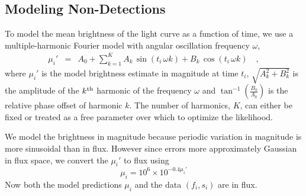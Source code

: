 \documentclass[12pt,preprint]{aastex}
\begin{document}
\subsection{Modeling Non-Detections}
To model the mean brightness of the light curve as a function of time, we use a multiple-harmonic Fourier model with angular oscillation frequency $\omega$,
\begin{eqnarray}\displaystyle
\mu_i' &=& A_0 + \sum_{k=1}^K A_k\, \sin (t_i \, \omega  k) + B_k\, \cos (t_i \, \omega  k)
\quad ,\label{eq:fourier}
\end{eqnarray}
where $\mu_i'$ is the model brightness estimate in magnitude at time $t_i$, $\sqrt{A_k^2 + B_k^2}$ is the amplitude of the $k^{\rm th}$ harmonic of the frequency $\omega$ and $\tan^{-1}(\frac{B_k}{A_k})$ is the relative phase offset of harmonic $k$.  The number of harmonics, $K$, can either be fixed or treated as a free parameter over which to optimize the likelihood.

We model the brightness in magnitude because periodic variation in magnitude is more sinusoidal than in flux. However since errors more approximately Gaussian in flux space, we convert the $\mu_i'$ to flux  using
\begin{equation*}
\mu_i = 10^6 \times 10^{-0.4 \mu_i'}
\end{equation*}
Now both the model predictions $\mu_i$ and the data $(f_i,s_i)$ are in flux.
\end{document}
